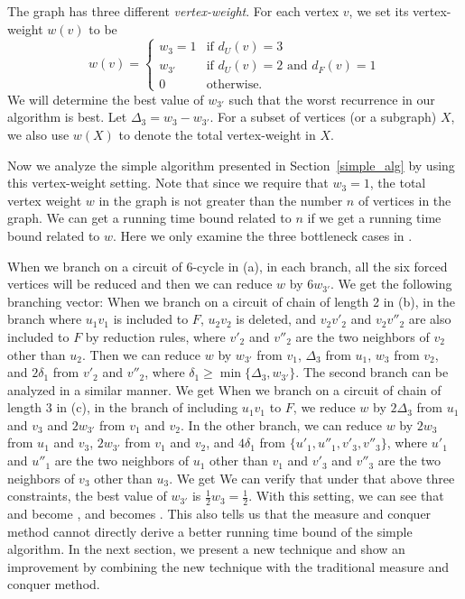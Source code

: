 \documentclass[runningheads]{llncs}
\begin{document}
The graph has three different {\em vertex-weight}.
For each vertex $v$, we set its vertex-weight $w(v)$
to be
\[ w(v)
=\left\{ \begin{array}{cl}
 w_3=1 & \mbox{if  $d_U(v)=3$ }\\
 w_{3'} & \mbox{if $d_U(v)=2$ and $d_F(v)=1$}\\
 0 & \mbox{otherwise.}   \end{array}
\right.\]
We will determine the best value of $w_{3'}$ such that the worst recurrence in our algorithm is best.
Let $\Delta_3=w_3-w_{3'}$. For a subset of vertices (or a subgraph) $X$, we also use $w(X)$ to denote the total vertex-weight in $X$.


Now we analyze the simple algorithm presented in Section~\ref{simple_alg} by using this vertex-weight setting. Note that since we require that $w_3=1$, the total vertex weight $w$ in the graph is not greater than the number $n$ of vertices in the graph. We can get a running time bound related to $n$ if we get a running time bound related to $w$.
Here we only examine the three bottleneck cases in .

When we branch on a circuit of 6-cycle in (a),  in  each branch,
all the six forced vertices will be reduced and then we can reduce $w$ by $6w_{3'}$.
We get the following branching vector:
When we branch on a circuit  of chain of length 2 in (b), in the branch where $u_1v_1$ is included to $F$, $u_2v_2$ is deleted, and $v_2v'_{2}$ and $v_2v''_{2}$ are also included to $F$ by reduction rules, where $v'_2$ and $v''_2$ are the two neighbors of $v_2$ other than $u_2$. Then we can reduce $w$ by $w_{3'}$ from $v_1$, $\Delta_3$ from $u_1$, $w_3$ from $v_2$, and $2\delta_1$ from $v'_2$ and $v''_2$, where $\delta_1\geq \min\{ \Delta_3,w_{3'} \}$. The second branch can be analyzed in a similar manner. We get
When we branch on a circuit  of chain of length 3 in (c), in the branch of including $u_1v_1$ to $F$, we reduce $w$ by $2\Delta_3$ from $u_1$ and $v_3$ and $2w_{3'}$ from $v_1$ and $v_2$. In the other branch, we can reduce $w$ by $2w_3$ from $u_1$ and $v_3$, $2w_{3'}$ from $v_1$ and $v_2$, and $4\delta_1$ from $\{u'_1,u''_1,v'_3,v''_3\}$, where $u'_1$ and $u''_1$ are the two neighbors of $u_1$ other than $v_1$ and $v'_3$ and $v''_3$ are the two neighbors of $v_3$ other than $u_3$. We get
We can verify that under that above three constraints, the best value of $w_{3'}$ is ${\frac{1}{2}}w_3=\frac{1}{2}$. With this setting, we can see that  and  become , and  becomes . This also tells us that the measure and conquer method cannot directly derive a better running time bound of the simple algorithm. In the next section, we present a new technique and show an improvement by combining the new technique with the traditional measure and conquer method.
\end{document}

